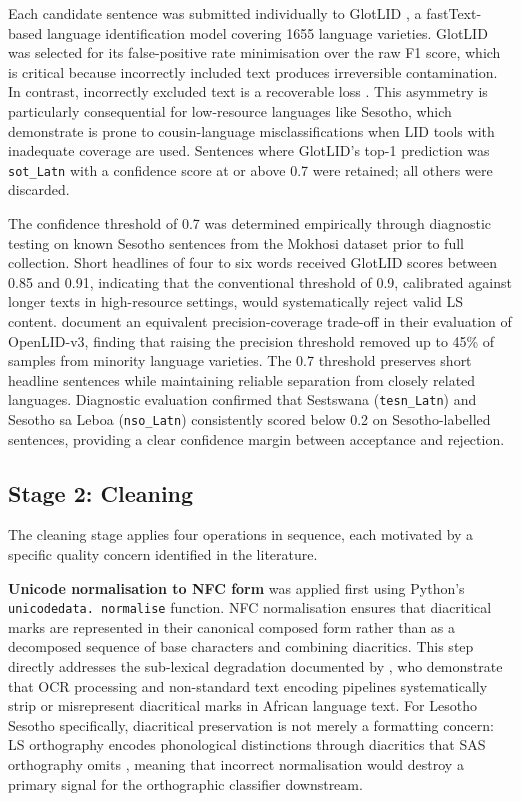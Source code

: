 \documentclass[12pt]{ThesisRU}
\begin{document}
Each candidate sentence was submitted individually to GlotLID \citep{kargaran2024glotcc}, a fastText-based language identification model covering 1655 language varieties. GlotLID was selected for its false-positive rate minimisation over the raw F1 score, which is critical because incorrectly included text produces irreversible contamination. In contrast, incorrectly excluded text is a recoverable loss \citep{kreutzer-etal-2022-quality}. This asymmetry is particularly consequential for low-resource languages like Sesotho, which \citet{kargaran2024glotcc} demonstrate is prone to cousin-language misclassifications when LID tools with inadequate coverage are used. Sentences where GlotLID's top-1 prediction was \texttt{sot\_Latn} with a confidence score at or above 0.7 were retained; all others were discarded.

The confidence threshold of 0.7 was determined empirically through diagnostic testing on known Sesotho sentences from the Mokhosi dataset prior to full collection. Short headlines of four to six words received GlotLID scores between 0.85 and 0.91, indicating that the conventional threshold of 0.9, calibrated against longer texts in high-resource settings, would systematically reject valid LS content. \citet{fedorova2026openlid} document an equivalent precision-coverage trade-off in their evaluation of OpenLID-v3, finding that raising the precision threshold removed up to 45\% of samples from minority language varieties. The 0.7 threshold preserves short headline sentences while maintaining reliable separation from closely related languages. Diagnostic evaluation confirmed that Sestswana (\texttt{tesn\_Latn}) and Sesotho sa Leboa (\texttt{nso\_Latn}) consistently scored below 0.2 on Sesotho-labelled sentences, providing a clear confidence margin between acceptance and rejection.
\subsection{Stage 2: Cleaning}
The cleaning stage applies four operations in sequence, each
motivated by a specific quality concern identified in the literature.

\textbf{Unicode normalisation to NFC form} was applied first using
Python's \texttt{unicodedata. normalise} function. NFC normalisation
ensures that diacritical marks are represented in their canonical
composed form rather than as a decomposed sequence of base characters
and combining diacritics. This step directly addresses the sub-lexical
degradation documented by \citet{de2007automatic}, who
demonstrate that OCR processing and non-standard text encoding
pipelines systematically strip or misrepresent diacritical marks in
African language text. For Lesotho Sesotho specifically, diacritical
preservation is not merely a formatting concern: LS orthography
encodes phonological distinctions through diacritics that SAS
orthography omits \citep{matlosa2017sesotho}, meaning that incorrect
normalisation would destroy a primary signal for the orthographic
classifier downstream.
\end{document}
